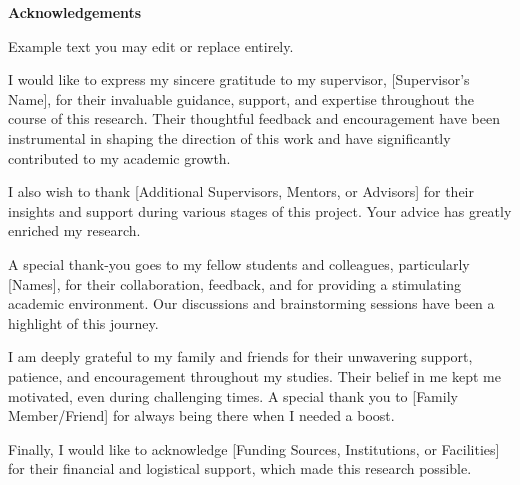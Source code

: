 \thispagestyle{plain}
\Huge
\textbf{Acknowledgements}
\vspace{1cm}

\normalsize
Example text you may edit or replace entirely.

I would like to express my sincere gratitude to my supervisor, [Supervisor's Name], for their invaluable guidance, support, and expertise throughout the course of this research. Their thoughtful feedback and encouragement have been instrumental in shaping the direction of this work and have significantly contributed to my academic growth.

I also wish to thank [Additional Supervisors, Mentors, or Advisors] for their insights and support during various stages of this project. Your advice has greatly enriched my research.

A special thank-you goes to my fellow students and colleagues, particularly [Names], for their collaboration, feedback, and for providing a stimulating academic environment. Our discussions and brainstorming sessions have been a highlight of this journey.

I am deeply grateful to my family and friends for their unwavering support, patience, and encouragement throughout my studies. Their belief in me kept me motivated, even during challenging times. A special thank you to [Family Member/Friend] for always being there when I needed a boost.

Finally, I would like to acknowledge [Funding Sources, Institutions, or Facilities] for their financial and logistical support, which made this research possible.
\mdseries

